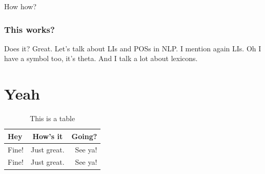 How how?

\subsubsection{This works?}
Does it? Great. Let's talk about \glspl{LI} and \glspl{POS} in \gls{NLP}. I mention again \glspl{LI}. Oh I have a symbol too, it's \gls{theta}. And I talk a lot about \glspl{lexicon}.

\section{Yeah}
\lipsum[5]

\begin{table}[hbt!]
\caption{This is a table}
\centering
\begin{tabular}{ l c r }
\hline
Hey & How's it & Going?\\ \hline
Fine! & Just great. & See ya!\\
Fine! & Just great. & See ya!\\
\hline
\end{tabular}
\end{table}

\lipsum[7-12]